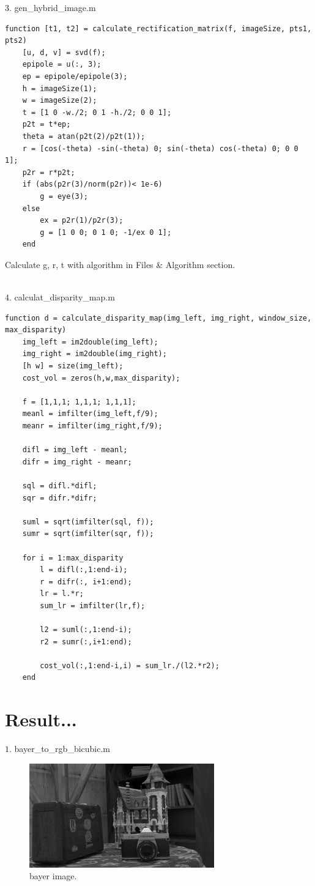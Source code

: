\newpage
{\large $3.$ gen\_hybrid\_image.m \par}
\begin{lstlisting}[style=Matlab-editor]
function [t1, t2] = calculate_rectification_matrix(f, imageSize, pts1, pts2)
    [u, d, v] = svd(f);
    epipole = u(:, 3);
    ep = epipole/epipole(3);
    h = imageSize(1);
    w = imageSize(2);
    t = [1 0 -w./2; 0 1 -h./2; 0 0 1];
    p2t = t*ep;
    theta = atan(p2t(2)/p2t(1));
    r = [cos(-theta) -sin(-theta) 0; sin(-theta) cos(-theta) 0; 0 0 1];
    p2r = r*p2t;
    if (abs(p2r(3)/norm(p2r))< 1e-6)
        g = eye(3);
    else
        ex = p2r(1)/p2r(3);
        g = [1 0 0; 0 1 0; -1/ex 0 1];
    end
\end{lstlisting}

Calculate g, r, t with algorithm in Files \& Algorithm section.\\\\

{\large $4.$ calculat\_disparity\_map.m \par}
\begin{lstlisting}[style=Matlab-editor]
function d = calculate_disparity_map(img_left, img_right, window_size, max_disparity)
    img_left = im2double(img_left);
    img_right = im2double(img_right);
    [h w] = size(img_left);
    cost_vol = zeros(h,w,max_disparity);
    
    f = [1,1,1; 1,1,1; 1,1,1];
    meanl = imfilter(img_left,f/9);
    meanr = imfilter(img_right,f/9);
    
    difl = img_left - meanl;
    difr = img_right - meanr;
    
    sql = difl.*difl;
    sqr = difr.*difr;
    
    suml = sqrt(imfilter(sql, f));
    sumr = sqrt(imfilter(sqr, f));
    
    for i = 1:max_disparity
        l = difl(:,1:end-i);
        r = difr(:, i+1:end);
        lr = l.*r;
        sum_lr = imfilter(lr,f);
        
        l2 = suml(:,1:end-i);
        r2 = sumr(:,i+1:end);
        
        cost_vol(:,1:end-i,i) = sum_lr./(l2.*r2);
    end
\end{lstlisting}

\pagebreak
\section*{Result...}  
{\large $1.$ bayer\_to\_rgb\_bicubic.m \par}
\begin{figure}[!h]
    \centering
    \includegraphics[width=8cm]{bayer_cam2.png}
    \caption{bayer image.}
    \label{fig:result1}
\end{figure}

